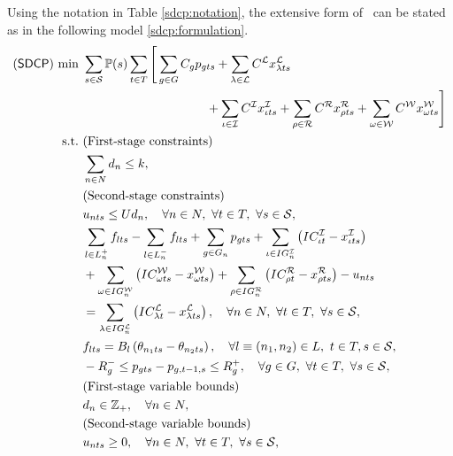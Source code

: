 Using the notation in Table \ref{sdcp:notation}, the extensive form of \sdcp\ can be stated as in the following model \ref{sdcp:formulation}.
\begin{subequations} \label{sdcp:formulation}
	\begin{align}
	(\sdcp)\ \textrm{min}\ &\sum_{s\in\mathcal{S}}\PP(s)\sum_{t\in T} 
	\Bigg[\sum_{g\in G}C_g p_{gts} + \sum_{\lambda\in \mathcal{L}} C^{\mathcal{L}}x_{\lambda ts}^{\mathcal{L}} \nonumber \\&\qquad\qquad\qquad\qquad\qquad + \sum_{\iota\in \mathcal{I}} C^{\mathcal{I}}x_{\iota ts}^{\mathcal{I}} + \sum_{\rho\in \mathcal{R}} C^{\mathcal{R}}x_{\rho ts}^{\mathcal{R}} + \sum_{\omega\in \mathcal{W}} C^{\mathcal{W}}x_{\omega ts}^{\mathcal{W}} \Bigg]
	\label{sdcp:obj}\\
	\textrm{s.t.}\ &  \textrm{(First-stage constraints)} \nonumber\\
	&\sum_{n\in N} d_n \le k,\label{sdcp:b}\\
	&\textrm{(Second-stage constraints)} \nonumber\\
	&u_{nts} \le Ud_n,\quad\forall n\in N,\ \forall t\in T,\ \forall s\in\mathcal{S},\label{sdcp:c}\\
	&\sum_{l\in L_n^+}f_{lts}-\sum_{l\in L_n^-}f_{lts}+\sum_{g\in G_n}p_{gts}+\sum_{\iota\in IG_n^\mathcal{I}}\left(IC_{\iota t}^\mathcal{I}-x_{\iota ts}^\mathcal{I}\right)\nonumber\\
	&+\sum_{\omega\in IG_n^\mathcal{W}}\left(IC_{\omega ts}^\mathcal{W}-x_{\omega ts}^\mathcal{W}\right)
	+\sum_{\rho\in IG_n^\mathcal{R}}\left(IC_{\rho t}^\mathcal{R}-x_{\rho ts}^\mathcal{R}\right)
	-u_{nts} \nonumber\\
	&=\sum_{\lambda\in IG_n^\mathcal{L}}\left(IC_{\lambda t}^\mathcal{L}-x_{\lambda ts}^\mathcal{L}\right),\quad\forall n\in N,\ \forall t\in T,\ \forall s\in\mathcal{S},\label{sdcp:d}\\
	&f_{lts}=B_l\left(  \theta_{n_1 ts}-\theta_{n_2 ts}  \right),\quad\forall l\equiv (n_1, n_2)\in L,\ t\in T, s\in\mathcal{S},\label{sdcp:e}\\
	&-R_g^- \le p_{gts}-p_{g,t-1,s} \le R_g^+ ,\quad\forall g\in G,\ \forall t\in T,\ \forall s\in\mathcal{S},\label{sdcp:f}\\
	&  \textrm{(First-stage variable bounds)} \nonumber\\
	&d_n \in \mathbb{Z}_+,\quad \forall n\in N,\label{sdcp:g}\\
	&  \textrm{(Second-stage variable bounds)} \nonumber\\
	&u_{nts}\ge 0,\quad\forall n\in N,\ \forall t\in T,\ \forall s\in\mathcal{S},\label{sdcp:h}\\

\end{align}
\end{subequations}
